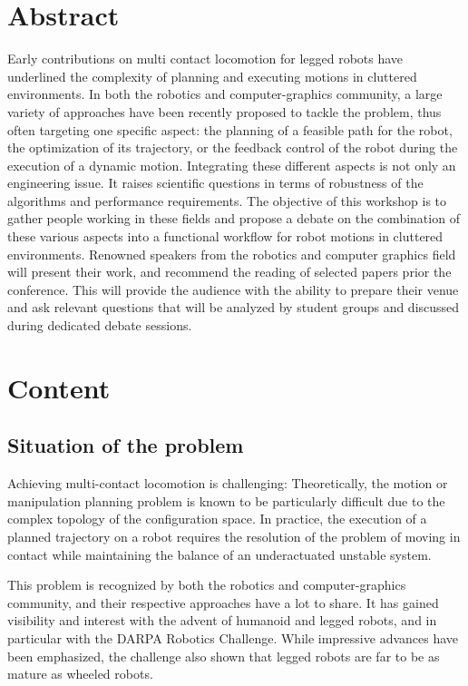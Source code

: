 \documentclass[12pt]{article}
\begin{document}
\section{\textbf{Abstract}}
Early contributions on multi contact locomotion for legged robots have underlined the complexity of planning and executing motions in cluttered environments. In both the robotics and computer-graphics community, a large variety of approaches have been recently proposed to tackle the problem, thus often targeting one specific aspect: the planning of a feasible path for the robot, the optimization of its trajectory, or the feedback control of the robot during
the execution of a dynamic motion. Integrating these different aspects is not only an engineering issue. It raises scientific questions in terms of robustness of the algorithms and performance requirements. The objective of this workshop is to gather people working in these fields and propose a debate on the combination of these various aspects into a functional workflow for robot motions in cluttered environments.
Renowned speakers from the robotics and computer graphics field will present their work, and recommend the reading of selected papers prior the conference.  This will provide the audience with the ability to prepare their venue and ask relevant questions that will be analyzed by student groups and discussed during dedicated debate sessions.


\section{Content}
\subsection{Situation of the problem}
Achieving multi-contact locomotion is challenging: Theoretically, the motion or manipulation planning problem is known to be particularly difficult due to the complex topology of the configuration space. In practice, the execution of a planned trajectory on a robot requires the resolution of the problem of moving in contact while maintaining the balance of an underactuated unstable system. 

This problem is recognized by both the robotics and computer-graphics community, and their respective approaches have a lot to share.
It has gained visibility and interest with the advent of humanoid and legged robots, and in particular with the DARPA Robotics Challenge. While impressive advances have been emphasized, the challenge also shown that legged robots are far to be as mature as wheeled robots.
\end{document}
